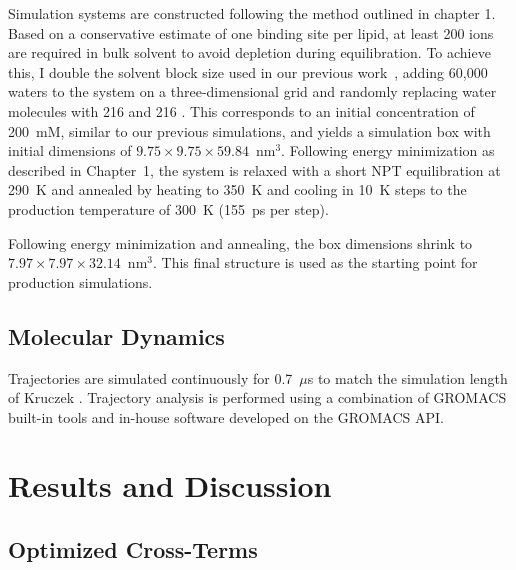 Simulation systems are constructed following the method outlined in chapter 1.
Based on a conservative estimate of one binding site per lipid,
at least 200 \na{} ions are required in bulk solvent to avoid depletion during
equilibration. To achieve this, I double the solvent block size used in our
previous work~\cite{kruczek:2017,kruczek:2019}, adding 60,000 waters to the
system on a three-dimensional grid and randomly replacing water molecules with
216 \na{} and 216 \cl{}. This corresponds to an initial concentration of 200~mM,
similar to our previous simulations, and yields a simulation box with initial
dimensions of $9.75 \times 9.75 \times 59.84$~nm$^3$. Following energy minimization as described in Chapter~1, 
the system is relaxed with a short NPT equilibration
at 290~K and annealed by heating to 350~K and cooling in 10~K steps to the
production temperature of 300~K (155~ps per step).

Following energy minimization and annealing, the box dimensions shrink to
$7.97 \times 7.97 \times 32.14$~nm$^3$. This final structure is used as the
starting point for production simulations.

\subsection{Molecular Dynamics}
Trajectories are simulated continuously for 0.7~$\mu$s to match the 
simulation length of Kruczek \etal{}\cite{kruczek:2017,kruczek:2019}.
Trajectory analysis is performed using a combination of GROMACS built-in
tools and in-house software developed on the GROMACS API.

\section{Results and Discussion}

\subsection{Optimized Cross-Terms}

